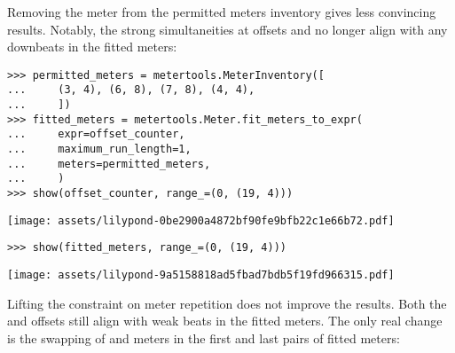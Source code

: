 \noindent Removing the  meter from the permitted meters inventory
gives less convincing results. Notably, the strong simultaneities at offsets
 and  no longer align with any downbeats in the
fitted meters:

\begin{comment}
<abjad>
permitted_meters = metertools.MeterInventory([
    (3, 4), (6, 8), (7, 8), (4, 4),
    ])
fitted_meters = metertools.Meter.fit_meters_to_expr(
    expr=offset_counter,
    maximum_run_length=1,
    meters=permitted_meters,
    )
show(offset_counter, range_=(0, (19, 4)))
show(fitted_meters, range_=(0, (19, 4)))
</abjad>
\end{comment}

\begin{abjadbookoutput}
\begin{singlespacing}
\vspace{-0.5\baselineskip}
\begin{verbatim}
>>> permitted_meters = metertools.MeterInventory([
...     (3, 4), (6, 8), (7, 8), (4, 4),
...     ])
>>> fitted_meters = metertools.Meter.fit_meters_to_expr(
...     expr=offset_counter,
...     maximum_run_length=1,
...     meters=permitted_meters,
...     )
>>> show(offset_counter, range_=(0, (19, 4)))
\end{verbatim}
\noindent\texttt{[image: assets/lilypond-0be2900a4872bf90fe9bfb22c1e66b72.pdf]}
\begin{verbatim}
>>> show(fitted_meters, range_=(0, (19, 4)))
\end{verbatim}
\noindent\texttt{[image: assets/lilypond-9a5158818ad5fbad7bdb5f19fd966315.pdf]}
\end{singlespacing}
\end{abjadbookoutput}

\noindent Lifting the constraint on meter repetition does not improve the
results. Both the  and  offsets still align with weak
beats in the fitted meters. The only real change is the swapping of
 and  meters in the first and last pairs of fitted
meters:

\begin{comment}
<abjad>
fitted_meters = metertools.Meter.fit_meters_to_expr(
    expr=offset_counter,
    meters=permitted_meters,
    )
show(offset_counter, range_=(0, (19, 4)))
show(fitted_meters, range_=(0, (19, 4)))
</abjad>
\end{comment}

